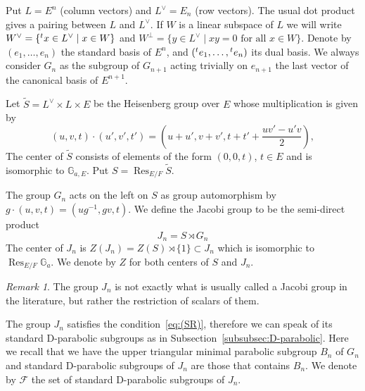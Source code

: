 \documentclass[letterpaper,11pt]{amsart}
\newcommand{\G}{\mathbb{G}}
\newcommand{\cF}{\mathcal{F}}
\newcommand{\<}{\negthickspace}
\newcommand{\tp}[1]{\prescript{t}{}{#1}}
\DeclareMathOperator{\Res}{Res}
\theoremstyle{definition}
\theoremstyle{plain}
\theoremstyle{remark}
\newtheorem{remark}[definition]{Remark}
\numberwithin{equation}{section}
\begin{document}
Put $L = E^n$ (column vectors) and $L^\vee = E_n$ (row vectors). The usual dot product gives a pairing between $L$ and $L^\vee$. If $W$ is a linear
subspace of $L$ we will write $W^\vee = \{\tp{x} \in L^\vee \mid x \in W\}$ and $W^\perp = \{ y \in L^\vee \mid x y = 0 \text{ for all } x \in W\}$. Denote by
$(e_1, \hdots, e_n)$ the standard basis of $E^n$, and $(\tp{e_1},\hdots,\tp{e_n})$
its dual basis. We always consider $G_n$ as the subgroup of $G_{n+1}$
acting trivially on $e_{n+1}$ the last vector of the canonical basis of $E^{n+1}$.

Let $\widetilde{S}= L^\vee  \times L \times E$ be the Heisenberg group over $E$ whose
multiplication is given by
    \[
    (u,v,t) \cdot (u',v',t') =
    \left( u+u', v+v', t+t'+\frac{uv'-u'v}{2} \right),
    \]
The center of $\widetilde{S}$ consists of elements of the form $(0, 0, t)$, $t \in E$ and
is isomorphic to $\G_{a, E}$. Put $S = \Res_{E/F} \widetilde{S}$.

The group $G_n$ acts on the left on $S$ as group automorphism by $g \cdot
(u,v,t)=(ug^{-1},gv,t)$. We define the Jacobi group to be the semi-direct
product
    \[
    J_n =  S \rtimes G_n
    \]
The center of $J_n$ is $Z(J_n)=Z(S) \rtimes \{1\} \subset J_n$ which is
isomorphic to $\Res_{E/F}\G_a$. We denote by $Z$ for both centers of $S$ and $J_n$.

\begin{remark}
The group $J_n$ is not exactly what is usually called a Jacobi group in the literature, but rather the restriction of scalars of them.
\end{remark}

The group $J_n$ satisfies the condition~\eqref{eq:(SR)}, therefore we can
speak of its standard D-parabolic subgroups as in
Subsection~\ref{subsubsec:D-parabolic}. Here we recall that we have the upper
triangular minimal parabolic subgroup $B_n$ of $G_n$ and standard D-parabolic subgroups
of $J_n$ are those that contains $B_n$. We denote by $\cF$ the set of standard
D-parabolic subgroups of $J_n$.
\end{document}

